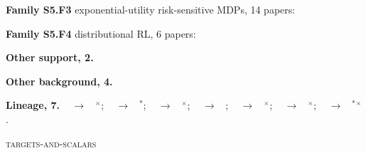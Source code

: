 \documentclass[10pt]{article}
\newcommand{\memb}[1]{\par\smallskip\textbf{#1}\quad}
\begin{document}
\memb{Family S5.F3} exponential-utility risk-sensitive MDPs, 14 papers: {\footnotesize \citetext{\citealp{Howard-risksensitive72}; \citealp{Jaquette-utility76}; \citealp{Fei-risksensitive20}; \citealp{Borkar-qlearning02}; \citealp{Borkar-risk02}; \citealp{Mihatsch-risksensitive02}; \citealp{vandenBroek-risk10}; \citealp{Bauerle-more14}; \citealp{Dvijotham-universal14}; \citealp{Nass-entropic19}; \citealp{Deletang-model21}; \citealp{Fei-exponential21}; \citealp{Biswas-ergodic23}; \citealp{Zhang-soft23}}}

\memb{Family S5.F4} distributional RL, 6 papers: {\footnotesize \citetext{\citealp{Bellemare-distributional17}; \citealp{Dabney-distributional18}; \citealp{Dabney-implicit18}; \citealp{Rowland-analysis18}; \citealp{Bellemare-distributional23}; \citealp{Liang-bridging22}}}

\memb{Other support, 2.} \citetext{\citealp{Sobel-variance82}; \citealp{Wang-reductions24}}

\memb{Other background, 4.} {\footnotesize \citetext{\citealp{White-mean88}\dag; \citealp{Ruszczynski-riskaverse10}; \citealp{AhmadiJavid-entropic11}; \citealp{Chow-risk15}}}

\memb{Lineage, 7.} {\footnotesize \citeauthor{Howard-risksensitive72}~\citeyear{Howard-risksensitive72} $\to$ \citeauthor{Jacobson-optimal73}~\citeyear{Jacobson-optimal73}$^\times$; \citeauthor{Howard-risksensitive72}~\citeyear{Howard-risksensitive72} $\to$ \citeauthor{Jaquette-utility76}~\citeyear{Jaquette-utility76}$^\ast$; \citeauthor{Howard-risksensitive72}~\citeyear{Howard-risksensitive72} $\to$ \citeauthor{Filar-variance89}~\citeyear{Filar-variance89}$^\times$; \citeauthor{Howard-risksensitive72}~\citeyear{Howard-risksensitive72} $\to$ \citeauthor{Fei-risksensitive20}~\citeyear{Fei-risksensitive20}; \citeauthor{Sobel-variance82}~\citeyear{Sobel-variance82} $\to$ \citeauthor{Filar-variance89}~\citeyear{Filar-variance89}$^\times$; \citeauthor{Sobel-variance82}~\citeyear{Sobel-variance82} $\to$ \citeauthor{Xia-team25}~\citeyear{Xia-team25}$^\times$; \citeauthor{Filar-variance89}~\citeyear{Filar-variance89} $\to$ \citeauthor{Wang-reductions24}~\citeyear{Wang-reductions24}$^\ast$$^\times$.}

\medskip\textsc{targets-and-scalars}
\end{document}
